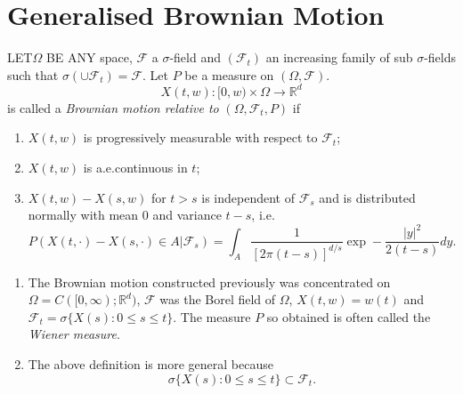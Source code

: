 \chapter{Generalised Brownian Motion}\label{chap5}

LET\pageoriginale $\Omega$ BE ANY space, $\mathscr{F}$ a
$\sigma$-field and $(\mathscr{F}_{t})$ an increasing family of sub
$\sigma$-fields such that $\sigma(\cup
\mathscr{F}_{t})=\mathscr{F}$. Let $P$ be a measure on
$(\Omega,\mathscr{F})$.
$$
X(t,w):[0,w)\times\Omega\to \mathbb{R}^{d}
$$
is called a {\em Brownian motion relative to}
$(\Omega,\mathscr{F}_{t},P)$ if 
\begin{enumerate}
\renewcommand{\theenumi}{\roman{enumi}}
\renewcommand{\labelenumi}{(\theenumi)}
\item $X(t,w)$ is progressively measurable with respect to
  $\mathscr{F}_{t}$;

\item $X(t,w)$ is a.e.\@ continuous in $t$;

\item $X(t,w)-X(s,w)$ for $t>s$ is independent of $\mathscr{F}_{s}$
  and is distributed normally with mean $0$ and variance $t-s$, i.e.
$$
P(X(t,\cdot)-X(s,\cdot)\in
A|\mathscr{F}_{s})=\int_{A}\frac{1}{[2\pi(t-s)]^{d/s}}\exp
-\frac{|y|^{2}}{2(t-s)}dy. 
$$
\end{enumerate}

\begin{note*}
\begin{enumerate}
\item The Brownian motion constructed previously was concentrated on
  $\Omega=C([0,\infty);\mathbb{R}^{d})$, $\mathscr{F}$ was the Borel
  field of $\Omega$, $X(t,w)=w(t)$ and
  $\mathscr{F}_{t}=\sigma\{X(s):0\leq s\leq t\}$. The measure $P$ so
  obtained is often called the {\em Wiener measure}.

\item The above definition is more general because
$$
\sigma\{X(s):0\leq s\leq t\}\subset \mathscr{F}_{t}.
$$
\end{enumerate}
\end{note*}


